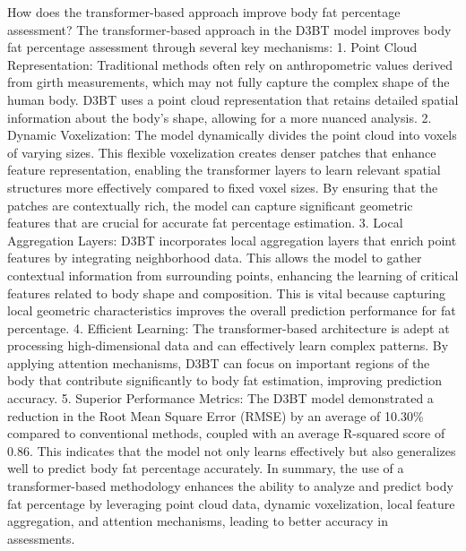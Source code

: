 \documentclass[conference, 12pt]{IEEEtran}
\begin{document}
How does the transformer-based approach improve body fat percentage assessment?
The transformer-based approach in the D3BT model improves body fat percentage assessment through several key mechanisms:
1. Point Cloud Representation: Traditional methods often rely on anthropometric values derived from girth measurements, which may not fully capture the complex shape of the human body. D3BT uses a point cloud representation that retains detailed spatial information about the body's shape, allowing for a more nuanced analysis.
2. Dynamic Voxelization: The model dynamically divides the point cloud into voxels of varying sizes. This flexible voxelization creates denser patches that enhance feature representation, enabling the transformer layers to learn relevant spatial structures more effectively compared to fixed voxel sizes. By ensuring that the patches are contextually rich, the model can capture significant geometric features that are crucial for accurate fat percentage estimation.
3. Local Aggregation Layers: D3BT incorporates local aggregation layers that enrich point features by integrating neighborhood data. This allows the model to gather contextual information from surrounding points, enhancing the learning of critical features related to body shape and composition. This is vital because capturing local geometric characteristics improves the overall prediction performance for fat percentage.
4. Efficient Learning: The transformer-based architecture is adept at processing high-dimensional data and can effectively learn complex patterns. By applying attention mechanisms, D3BT can focus on important regions of the body that contribute significantly to body fat estimation, improving prediction accuracy.
5. Superior Performance Metrics: The D3BT model demonstrated a reduction in the Root Mean Square Error (RMSE) by an average of 10.30\% compared to conventional methods, coupled with an average R-squared score of 0.86. This indicates that the model not only learns effectively but also generalizes well to predict body fat percentage accurately.
In summary, the use of a transformer-based methodology enhances the ability to analyze and predict body fat percentage by leveraging point cloud data, dynamic voxelization, local feature aggregation, and attention mechanisms, leading to better accuracy in assessments.
\end{document}
